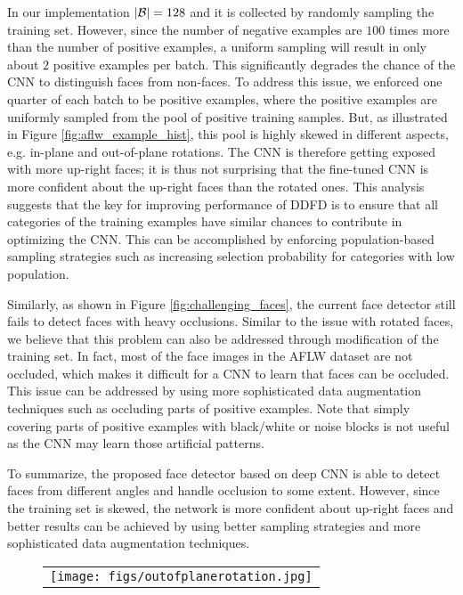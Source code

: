 \documentclass{sig-alternate-2013}
\begin{document}
In our implementation $|{\cal B}| = 128$ and it is collected by randomly sampling the training set. However, since the number of negative examples are $100$ times more than the number of positive examples, a uniform sampling will result in only about $2$ positive examples per batch. This significantly degrades the chance of the CNN to distinguish faces from non-faces. To address this issue, we enforced one quarter of each batch to be positive examples, where the positive examples are uniformly sampled from the pool of positive training samples. But, as illustrated in Figure \ref{fig:aflw_example_hist}, this pool is highly skewed in different aspects, e.g. in-plane and out-of-plane rotations. The CNN is therefore getting exposed with more up-right faces; it is thus not surprising that the fine-tuned CNN is more confident about the up-right faces than the rotated ones. This analysis suggests that the key for improving performance of DDFD is to ensure that all categories of the training examples have similar chances to contribute in optimizing the CNN. This can be accomplished by enforcing population-based sampling strategies such as increasing selection probability for categories with low population.

Similarly, as shown in Figure \ref{fig:challenging_faces}, the current face detector still fails to detect faces with heavy occlusions. Similar to the issue with rotated faces, we believe that this problem can also be addressed through modification of the training set. In fact, most of the face images in the AFLW dataset \cite{AFLW} are not occluded, which makes it difficult for a CNN to learn that faces can be occluded. This issue can be addressed by using more sophisticated data augmentation techniques such as occluding parts of positive examples. Note that simply covering parts of positive examples with black/white or noise blocks is not useful as the CNN may learn those artificial patterns. 

To summarize, the proposed face detector based on deep CNN is able to detect faces from different angles and handle occlusion to some extent. However, since the training set is skewed, the network is more confident about up-right faces and better results can be achieved by using better sampling strategies and more sophisticated data augmentation techniques.


\begin{figure}[t]
  \centering
	\begin{tabular}{c}
    	\texttt{[image: figs/outofplanerotation.jpg]} \\
    \end{tabular}
  \caption{}
  \label{fig:face_rotations}
\end{figure}
\end{document}

